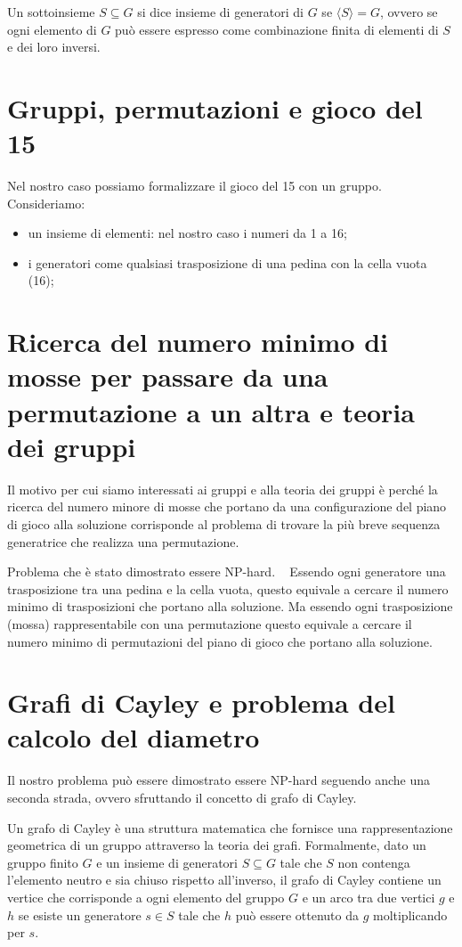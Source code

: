 Un sottoinsieme $S \subseteq G$ si dice insieme di generatori di $G$ se $\langle S \rangle = G$, ovvero se ogni elemento di $G$ può essere espresso come combinazione finita di elementi di $S$ e dei loro inversi.

\section{Gruppi, permutazioni e gioco del 15}
Nel nostro caso possiamo formalizzare il gioco del 15 con un gruppo.
Consideriamo: 
\begin{itemize}
    \item un insieme di elementi: nel nostro caso i numeri da 1 a 16;
    \item i generatori come qualsiasi trasposizione di una pedina con la cella vuota (16); 
\end{itemize}

\section{Ricerca del numero minimo di mosse per passare da una permutazione a un altra e teoria dei gruppi}

Il motivo per cui siamo interessati ai gruppi e alla teoria dei gruppi è perché la ricerca del numero minore di mosse che portano da una configurazione del piano di gioco alla soluzione corrisponde al problema di trovare la più breve sequenza generatrice che realizza una permutazione. ~\cite{2} 

Problema che è stato dimostrato essere NP-hard. ~\cite{9} 
Essendo ogni generatore una trasposizione tra una pedina e la cella vuota, questo equivale a cercare il numero minimo di trasposizioni che portano alla soluzione.
Ma essendo ogni trasposizione (mossa) rappresentabile con una permutazione questo equivale a cercare il numero minimo di permutazioni del piano di gioco che portano alla soluzione. 

\section{Grafi di Cayley e problema del calcolo del diametro}
Il nostro problema può essere dimostrato essere NP-hard seguendo anche una seconda strada, ovvero sfruttando il concetto di grafo di Cayley. 

Un grafo di Cayley è una struttura matematica che fornisce una rappresentazione geometrica di un gruppo attraverso la teoria dei grafi. Formalmente, dato un gruppo finito $G$ e un insieme di generatori $S \subseteq G$ tale che $S$ non contenga l'elemento neutro e sia chiuso rispetto all'inverso, il grafo di Cayley contiene un vertice che corrisponde a ogni elemento del gruppo $G$ e un arco tra due vertici $g$ e $h$ se esiste un generatore $s \in S$ tale che $h$ può essere ottenuto da $g$ moltiplicando per $s$. 

